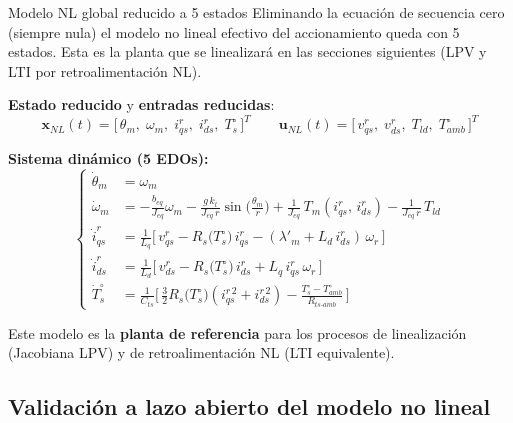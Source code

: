\documentclass[aspectratio=169,t]{beamer}
\begin{document}
\begin{frame}{Modelo NL global reducido a 5 estados}
{\small\color{uncGray}Eliminando la ecuación de secuencia cero (siempre nula) el modelo no lineal efectivo del accionamiento queda con 5 estados. Esta es la planta que se linealizará en las secciones siguientes (LPV y LTI por retroalimentación NL).}\par
\vspace{2mm}

\textbf{Estado reducido} y \textbf{entradas reducidas}:
\begin{equation*}
\bm{x}_{NL}(t) = \big[\,\theta_m,\;\omega_m,\;i_{qs}^{r},\;i_{ds}^{r},\;T_s^\circ\,\big]^T
\qquad
\bm{u}_{NL}(t) = \big[\,v_{qs}^{r},\;v_{ds}^{r},\;T_{ld},\;T_{amb}^\circ\,\big]^T
\end{equation*}

\textbf{Sistema dinámico (5 EDOs):}
\footnotesize
\begin{equation*}
\left\{
\begin{aligned}
\dot{\theta}_m &= \omega_m \\
\dot{\omega}_m &= -\tfrac{b_{eq}}{J_{eq}}\omega_m - \tfrac{g\,k_l}{J_{eq}\,r}\sin\!\big(\tfrac{\theta_m}{r}\big) + \tfrac{1}{J_{eq}}\,T_m(i_{qs}^{r},\,i_{ds}^{r}) - \tfrac{1}{J_{eq}\,r}\,T_{ld} \\
\dot{i}_{qs}^{r} &= \tfrac{1}{L_q}\!\big[\,v_{qs}^{r} - R_s\!\big(T_s^\circ\big)\, i_{qs}^{r} - (\lambda'_m + L_d\,i_{ds}^{r})\,\omega_r\,\big] \\
\dot{i}_{ds}^{r} &= \tfrac{1}{L_d}\!\big[\,v_{ds}^{r} - R_s\!\big(T_s^\circ\big)\, i_{ds}^{r} + L_q\,i_{qs}^{r}\,\omega_r\,\big] \\
\dot{T}_s^\circ &= \tfrac{1}{C_{ts}}\!\big[\,\tfrac{3}{2}R_s\!\big(T_s^\circ\big)(i_{qs}^{r\,2}+i_{ds}^{r\,2}) - \tfrac{T_s^\circ - T_{amb}^\circ}{R_{ts\text{-}amb}}\,\big]
\end{aligned}\right.
\end{equation*}
\normalsize

\vspace{1mm}
{\small Este modelo es la \textbf{planta de referencia} para los procesos de linealización (Jacobiana LPV) y de retroalimentación NL (LTI equivalente).}
\end{frame}

\subsection{Validación a lazo abierto del modelo no lineal}
\end{document}

